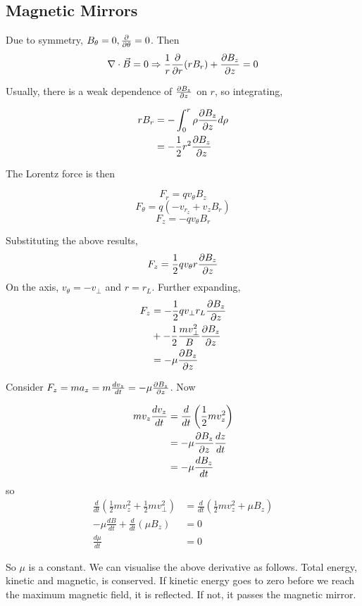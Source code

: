 \documentclass[12pt]{article}
\begin{document}
\subsection{Magnetic Mirrors}

Due to symmetry, $B_\theta = 0, \frac{\partial }{\partial \theta} = 0$. Then
$$\nabla \cdot \vec B = 0 \Rightarrow \frac{1}{r} \frac{\partial }{\partial r}(rB_r) + \frac{\partial B_z}{\partial z} = 0$$

Usually, there is a weak dependence of $\frac{\partial B_z}{\partial z}$ on $r$, so integrating,

\begin{align*}
    rB_r &= -\int_0^r \rho\frac{\partial B_z}{\partial z}d\rho \\
         &= -\frac{1}{2}r^2 \frac{\partial B_z}{\partial z}
\end{align*}

The Lorentz force is then

$$F_r = qv_\theta B_z$$
$$F_\theta = q(-v_{r_z} + v_zB_r)$$
$$F_z = -qv_\theta B_r$$

Substituting the above results,
$$F_z = \frac{1}{2}qv_\theta r\frac{\partial B_z}{\partial z}$$
On the axis, $v_\theta = -v_\perp$ and $r = r_L$. Further expanding,
\begin{align*}
    F_z &= -\frac{1}{2} qv_\perp r_L \frac{\partial B_z}{\partial z} \\
        &+ -\frac{1}{2} \frac{mv_\perp^2}{B} \frac{\partial B_z}{\partial z} \\
        &= -\mu \frac{\partial B_z}{\partial z}
\end{align*}

Consider $F_z = ma_z = m\frac{dv_z}{dt} = -\mu \frac{\partial B_z}{\partial z}$. Now

\begin{align*}
    mv_z\frac{dv_z}{dt} &= \frac{d}{dt} \left(\frac{1}{2}mv_z^2\right) \\
                         &= -\mu \frac{\partial B_z}{\partial z} \frac{dz}{dt} \\
                         &= -\mu \frac{dB_z}{dt}
\end{align*}
so
\begin{align*}
    \frac{d}{dt}\left(\frac{1}{2} mv_z^2 + \frac{1}{2} mv_\perp^2\right) &= \frac{d}{dt}\left(\frac{1}{2}mv_z^2 + \mu B_z\right) \\
    -\mu\frac{dB}{dt} + \frac{d}{dt}(\mu B_z) &= 0 \\
    \frac{d\mu}{dt} &= 0
\end{align*}

So $\mu$ is a constant. We can visualise the above derivative as follows. Total energy, kinetic and magnetic, is conserved. If kinetic energy goes to zero before we reach the maximum magnetic field, it is reflected. If not, it passes the magnetic mirror. \\
\end{document}
